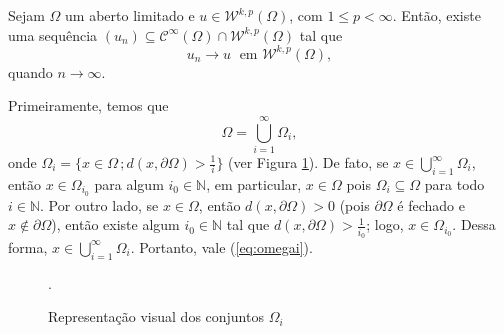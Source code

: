 \documentclass[a4paper, 11pt]{book}
\theoremstyle{definition}
\newcommand{\bN}{\mathbb{N}}
\newcommand{\cC}{\mathcal{C}}
\newcommand{\cW}{\mathcal{W}}
\begin{document}
\begin{tbox} \label{thm:aprox-2}
    Sejam $\Omega$ um aberto limitado e $u \in \cW^{k,p}(\Omega)$, com $1 \leqslant p < \infty$.
    Então, existe uma sequência $(u_n) \subseteq \cC^{\infty}(\Omega) \cap \cW^{k,p}(\Omega)$ tal que
    \[
        u_n \to u \;\text{ em } \cW^{k,p}(\Omega),
    \] 
    quando $n \to \infty$.
\end{tbox}
\begin{prf}
    Primeiramente, temos que
    \begin{equation} \label{eq:omegai}
        \Omega = \bigcup_{i=1}^\infty \Omega_i,
    \end{equation}
    onde $\Omega_i = \{x \in \Omega \,; d(x, \partial\Omega) > \tfrac{1}{i}\}$ (ver Figura \ref{fig:omegai}). De fato,
    se $x \in \bigcup_{i=1}^\infty \Omega_i$, então $x \in \Omega_{i_0}$ para algum $i_0 \in \bN$, em particular, $x \in \Omega$ pois $\Omega_i \subseteq \Omega$ para todo $i \in \bN$.
    Por outro lado, se $x \in \Omega$, então $d(x,\partial \Omega) > 0$ (pois $\partial\Omega$ é fechado e $x \not\in \partial\Omega$), então existe algum $i_0 \in \bN$ tal que $d(x, \partial \Omega) > \frac{1}{i_0}$; logo, $x \in \Omega_{i_0}$. Dessa forma, $x \in \bigcup_{i=1}^\infty \Omega_i$.
    Portanto, vale (\ref{eq:omegai}). 
    \begin{figure}
        \centering
        
        \caption{Representação visual dos conjuntos $\Omega_i$}.
        \label{fig:omegai}
    \end{figure}
    

\end{prf}
\end{document}

